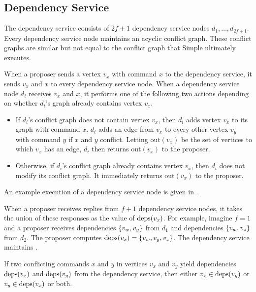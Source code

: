 \subsection{Dependency Service}
The dependency service consists of $2f+1$ dependency service nodes $d_1,
\ldots, d_{2f+1}$. Every dependency service node maintains an acyclic conflict
graph.  These conflict graphs are similar but not equal to the conflict graph
that Simple \BPaxos{} ultimately executes.

\newcommand{\out}[1]{\text{out}(#1)}
When a proposer sends a vertex $v_x$ with command $x$ to the dependency
service, it sends $v_x$ and $x$ to every dependency service node. When a
dependency service node $d_i$ receives $v_x$ and $x$, it performs one of the
following two actions depending on whether $d_i$'s graph already contains
vertex $v_x$.
\begin{itemize}
  \item
    If $d_i$'s conflict graph does not contain vertex $v_x$, then $d_i$ adds
    vertex $v_x$ to its graph with command $x$. $d_i$ adds an edge from $v_x$
    to every other vertex $v_y$ with command $y$ if $x$ and $y$ conflict.
    Letting $\out{v_x}$ be the set of vertices to which $v_x$ has an edge,
    $d_i$ then returns $\out{v_x}$ to the proposer.

  \item
    Otherwise, if $d_i$'s conflict graph already contains vertex $v_x$, then
    $d_i$ does not modify its conflict graph. It immediately returns
    $\out{v_x}$ to the proposer.
\end{itemize}
An example execution of a dependency service node is given in
.

When a proposer receives replies from $f+1$ dependency service nodes, it
takes the union of these responses as the value of $\text{deps}(v_x)$. For example,
imagine $f= 1$ and a proposer receives dependencies $\{v_w, v_y\}$ from $d_1$
and dependencies $\{v_w, v_z\}$ from $d_2$. The proposer computes $\text{deps}(v_x)
= \{v_w, v_y, v_z\}$. The dependency service maintains
.

{}

\begin{invariant}
If two conflicting commands $x$ and $y$ in vertices $v_x$ and $v_y$ yield
dependencies $\text{deps}(v_x)$ and $\text{deps}(v_y)$ from the dependency service, then
either $v_x \in \text{deps}(v_y)$ or $v_y \in \text{deps}(v_x)$ or both.
\end{invariant}

